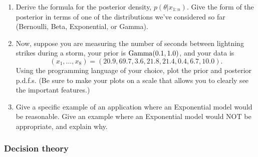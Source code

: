 \documentclass[12pt]{article}
\begin{document}
\begin{enumerate}
\item Derive the formula for the posterior density, $p(\theta|x_{1:n})$. Give the form of the posterior in terms of one of the distributions we've considered so far (Bernoulli, Beta, Exponential, or Gamma).
\item Now, suppose you are measuring the number of seconds between lightning strikes during a storm, your prior is $\operatorname*{Gamma}(0.1,1.0)$, and your data is
$$(x_1,\dotsc,x_8) = (20.9, 69.7, 3.6, 21.8, 21.4, 0.4, 6.7, 10.0).$$
Using the programming language of your choice, plot the prior and posterior p.d.f.s. (Be sure to make your plots on a scale that allows you to clearly see the important features.)
\item Give a specific example of an application where an Exponential model would be reasonable. Give an example where an Exponential model would NOT be appropriate, and explain why.
\end{enumerate}


\subsubsection*{Decision theory}
\end{document}

